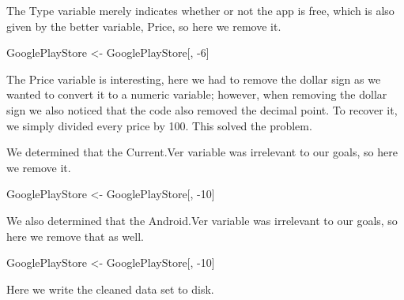 \documentclass[]{article}
\newenvironment{Shaded}{\begin{snugshade}}{\end{snugshade}}
\newcommand{\KeywordTok}[1]{\textcolor[rgb]{0.13,0.29,0.53}{\textbf{{#1}}}}
\newcommand{\DecValTok}[1]{\textcolor[rgb]{0.00,0.00,0.81}{{#1}}}
\newcommand{\StringTok}[1]{\textcolor[rgb]{0.31,0.60,0.02}{{#1}}}
\newcommand{\NormalTok}[1]{{#1}}
\begin{document}
The Type variable merely indicates whether or not the app is free, which
is also given by the better variable, Price, so here we remove it.

\begin{Shaded}
\begin{Highlighting}[]
\NormalTok{GooglePlayStore <-}\StringTok{ }\NormalTok{GooglePlayStore[, -}\DecValTok{6}\NormalTok{]}
\end{Highlighting}
\end{Shaded}

The Price variable is interesting, here we had to remove the dollar sign
as we wanted to convert it to a numeric variable; however, when removing
the dollar sign we also noticed that the code also removed the decimal
point. To recover it, we simply divided every price by 100. This solved
the problem.

\begin{Shaded}
\end{Shaded}

We determined that the Current.Ver variable was irrelevant to our goals,
so here we remove it.

\begin{Shaded}
\begin{Highlighting}[]
\NormalTok{GooglePlayStore <-}\StringTok{ }\NormalTok{GooglePlayStore[, -}\DecValTok{10}\NormalTok{]}
\end{Highlighting}
\end{Shaded}

We also determined that the Android.Ver variable was irrelevant to our
goals, so here we remove that as well.

\begin{Shaded}
\begin{Highlighting}[]
\NormalTok{GooglePlayStore <-}\StringTok{ }\NormalTok{GooglePlayStore[, -}\DecValTok{10}\NormalTok{]}
\end{Highlighting}
\end{Shaded}

Here we write the cleaned data set to disk.
\end{document}
